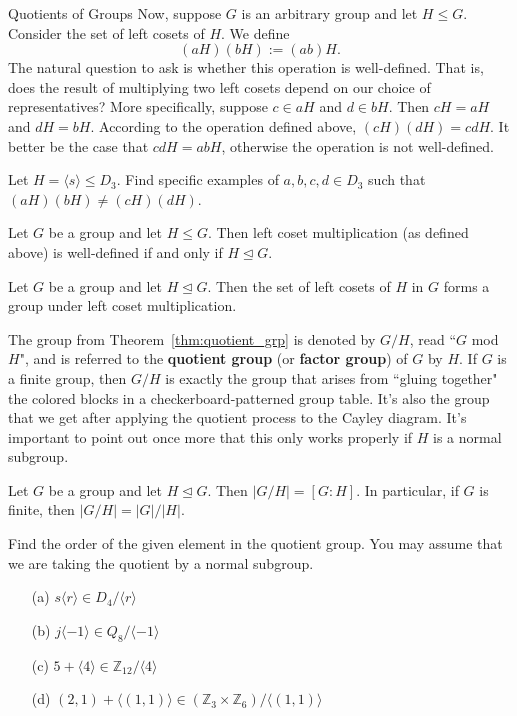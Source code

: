 \begin{section}{Quotients of Groups}
Now, suppose \(G\) is an arbitrary group and let \(H\leq G\). Consider the set of left cosets of \(H\).  We define
\[
(aH)(bH):=(ab)H.
\]
The natural question to ask is whether this operation is well-defined.  That is, does the result of multiplying two left cosets depend on our choice of representatives?  More specifically, suppose \(c\in aH\) and \(d\in bH\).  Then \(cH=aH\) and \(dH=bH\).  According to the operation defined above, \((cH)(dH)=cdH\).  It better be the case that \(cdH=abH\), otherwise the operation is not well-defined.

\begin{exercise}
Let \(H=\langle s\rangle \leq D_3\).  Find specific examples of \(a,b,c,d\in D_3\) such that \((aH)(bH)\neq (cH)(dH)\).
\end{exercise}

\begin{theorem}
Let \(G\) be a group and let \(H\leq G\).  Then left coset multiplication (as defined above) is well-defined if and only if \(H\trianglelefteq G\).
\end{theorem}

\begin{theorem}\label{thm:quotient_grp}
Let \(G\) be a group and let \(H\trianglelefteq G\).  Then the set of left cosets of \(H\) in \(G\) forms a group under left coset multiplication.
\end{theorem}

The group from Theorem~\ref{thm:quotient_grp} is denoted by \(G/H\), read ``\(G\) mod \(H\)", and is referred to the \textbf{quotient group} (or \textbf{factor group}) of \(G\) by \(H\).  If \(G\) is a finite group, then \(G/H\) is exactly the group that arises from ``gluing together" the colored blocks in a checkerboard-patterned group table.  It's also the group that we get after applying the quotient process to the Cayley diagram.  It's important to point out once more that this only works properly if \(H\) is a normal subgroup.

\begin{theorem}
Let \(G\) be a group and let \(H\trianglelefteq G\).  Then \(|G/H|=[G:H]\).  In particular, if \(G\) is finite, then \(|G/H|=|G|/|H|\).
\end{theorem}

\begin{exercise}%
Find the order of the given element in the quotient group. You may assume that we are taking the quotient by a normal subgroup. 
\begin{enumerate}
\item[(a)] \(s\langle r\rangle \in D_4/\langle r\rangle\)
\item[(b)] \(j\langle -1\rangle \in Q_8/\langle -1\rangle\)
\item[(c)] \(5+\langle 4\rangle \in \mathbb{Z}_{12}/\langle 4\rangle\)
\item[(d)] \((2,1)+\langle (1,1)\rangle \in (\mathbb{Z}_3\times \mathbb{Z}_6)/\langle (1,1)\rangle\) 
\end{enumerate}
 

\end{exercise}
\end{section}
